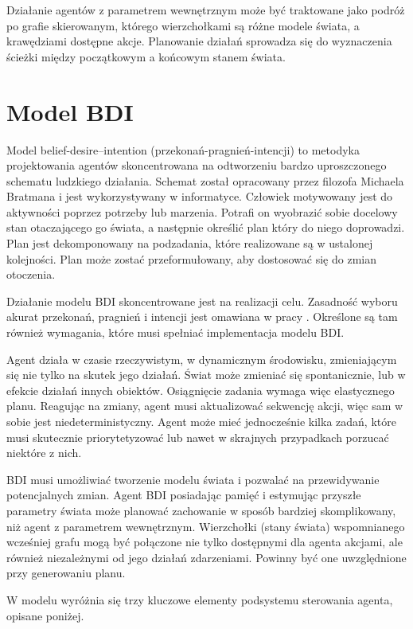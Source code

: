 Działanie agentów z parametrem wewnętrznym może być traktowane jako podróż po grafie skierowanym, którego wierzchołkami są różne modele świata, a krawędziami dostępne akcje. Planowanie działań sprowadza się do wyznaczenia ścieżki między początkowym a końcowym stanem świata.

\section{Model BDI}
Model belief-desire–intention (przekonań-pragnień-intencji) to metodyka projektowania agentów skoncentrowana na odtworzeniu bardzo uproszczonego schematu ludzkiego działania. Schemat został opracowany przez filozofa Michaela Bratmana i jest wykorzystywany w informatyce. Człowiek motywowany jest do aktywności poprzez potrzeby lub marzenia. Potrafi on wyobrazić sobie docelowy stan otaczającego go świata, a następnie określić plan który do niego doprowadzi. Plan jest dekomponowany na podzadania, które realizowane są w ustalonej kolejności. Plan może zostać przeformułowany, aby dostosować się do zmian otoczenia.

Działanie modelu BDI skoncentrowane jest na realizacji celu. Zasadność wyboru akurat przekonań, pragnień i intencji jest omawiana w pracy \cite{RAO}. Określone są tam również wymagania, które musi spełniać implementacja modelu BDI.

Agent działa w czasie rzeczywistym, w dynamicznym środowisku, zmieniającym się nie tylko na skutek jego działań. Świat może zmieniać się spontanicznie, lub w efekcie działań innych obiektów. Osiągnięcie zadania wymaga więc elastycznego planu. Reagując na zmiany, agent musi aktualizować sekwencję akcji, więc sam w sobie jest niedeterministyczny. Agent może mieć jednocześnie kilka zadań, które musi skutecznie priorytetyzować lub nawet w skrajnych przypadkach porzucać niektóre z nich. %

BDI musi umożliwiać tworzenie modelu świata i pozwalać na przewidywanie potencjalnych zmian. Agent BDI posiadając pamięć i estymując przyszłe parametry świata może planować zachowanie w sposób bardziej skomplikowany, niż agent z parametrem wewnętrznym. Wierzchołki (stany świata) wspomnianego wcześniej grafu mogą być połączone nie tylko dostępnymi dla agenta akcjami, ale również niezależnymi od jego działań zdarzeniami. Powinny być one uwzględnione przy generowaniu planu.

W modelu wyróżnia się trzy kluczowe elementy podsystemu sterowania agenta, opisane poniżej. 

